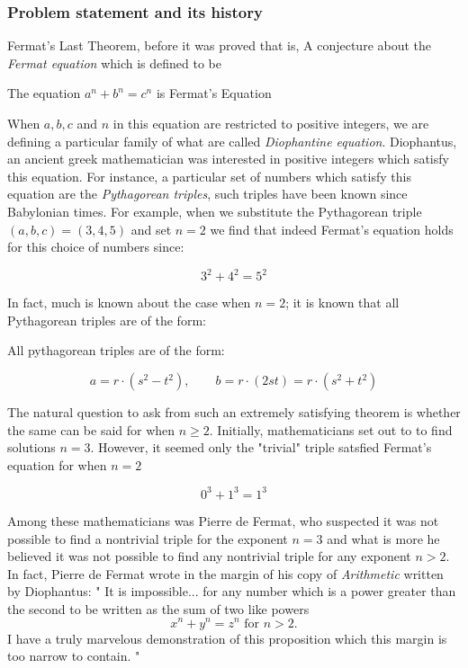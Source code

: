 \subsubsection{Problem statement and its history}
Fermat's Last Theorem, before it was proved that is, A conjecture about the \textit{Fermat equation} which is defined to be

\begin{definition}
    The equation $a^n + b^n = c^n$ is Fermat's Equation
\end{definition}

When $a, b, c$ and $n$ in this equation are restricted to positive integers, we are defining a particular family of what are called \textit{Diophantine equation}.
Diophantus, an ancient greek mathematician was interested in positive integers which satisfy this equation. For instance, a particular set of numbers which satisfy this equation 
are the \textit{Pythagorean triples}, such triples have been known since Babylonian times. For example, when we substitute the Pythagorean triple $(a,b,c) = (3,4,5)$ and set $n = 2$ we find that 
indeed Fermat's equation holds for this choice of numbers since:

\[
3^2 + 4^2 = 5^2
\]

In fact, much is known about the case when $n = 2$; it is known that all Pythagorean triples are of the form:

\begin{theorem}
    All pythagorean triples are of the form:

    \[
    a = r \cdot (s^2 - t^2), \qquad b = r \cdot (2st) = r \cdot (s^2 + t^2)
    \]
\end{theorem}

The natural question to ask from such an extremely satisfying theorem is whether the same can be said for when $n \ge 2$. Initially, mathematicians set out to
to find solutions $n = 3$. However, it seemed only the "trivial" triple satsfied Fermat's equation for when $n = 2$

\[
0^3 + 1^3 = 1^3
\]

Among these mathematicians was Pierre de Fermat, who suspected it was not possible to find a nontrivial triple for the exponent $n= 3$ and what is more he believed
it was not possible to find any nontrivial triple for any exponent $n > 2$. In fact, Pierre de Fermat wrote in the margin of his copy of \textit{Arithmetic} written by Diophantus:
"
It is impossible... for any number which is a power greater than the second to be written as the sum of two like powers 
\[ 
x^n + y^n = z^n \text{ for } n > 2.
\]
I have a truly marvelous demonstration of this proposition which this margin is too narrow to contain.
"

